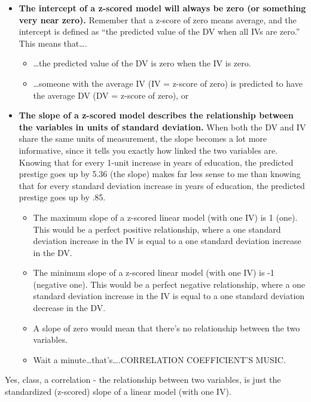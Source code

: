 \documentclass[
  letterpaper,
  DIV=11,
  numbers=noendperiod,
  oneside]{scrreprt}
\begin{document}
\begin{itemize}
\item
  \textbf{The intercept of a z-scored model will always be zero (or
  something very near zero).} Remember that a z-score of zero means
  average, and the intercept is defined as ``the predicted value of the
  DV when all IVs are zero.'' This means that\ldots.

  \begin{itemize}
  \item
    \ldots the predicted value of the DV is zero when the IV is zero.
  \item
    \ldots someone with the average IV (IV = z-score of zero) is
    predicted to have the average DV (DV = z-score of zero), or~
  \end{itemize}
\item
  \textbf{The slope of a z-scored model describes the relationship
  between the variables in units of standard deviation.} When both the
  DV and IV share the same units of measurement, the slope becomes a lot
  more informative, since it tells you exactly how linked the two
  variables are. Knowing that for every 1-unit increase in years of
  education, the predicted prestige goes up by 5.36 (the slope) makes
  far less sense to me than knowing that for every standard deviation
  increase in years of education, the predicted prestige goes up by .85.

  \begin{itemize}
  \item
    The maximum slope of a z-scored linear model (with one IV) is 1
    (one). This would be a perfect positive relationship, where a one
    standard deviation increase in the IV is equal to a one standard
    deviation increase in the DV.~
  \item
    The minimum slope of a z-scored linear model (with one IV) is -1
    (negative one). This would be a perfect negative relationship, where
    a one standard deviation increase in the IV is equal to a one
    standard deviation decrease in the DV.~
  \item
    A slope of zero would mean that there's no relationship between the
    two variables.
  \item
    Wait a minute\ldots that's\ldots.CORRELATION COEFFICIENT'S MUSIC.
  \end{itemize}
\end{itemize}

Yes, class, a correlation - the relationship between two variables, is
just the standardized (z-scored) slope of a linear model (with one IV).
\end{document}
